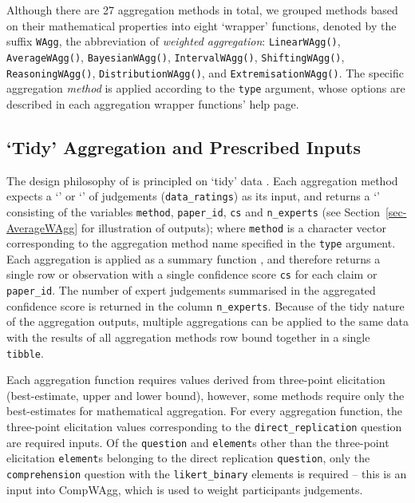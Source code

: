 \documentclass[article]{jss}
\newcommand{\class}[1]{`\code{#1}'}
\begin{document}
Although there are 27 aggregation methods in total, we grouped methods
based on their mathematical properties into eight `wrapper' functions,
denoted by the suffix \texttt{WAgg}, the abbreviation of \emph{weighted
aggregation}: \texttt{LinearWAgg()}, \texttt{AverageWAgg()},
\texttt{BayesianWAgg()}, \texttt{IntervalWAgg()},
\texttt{ShiftingWAgg()}, \texttt{ReasoningWAgg()},
\texttt{DistributionWAgg()}, and \texttt{ExtremisationWAgg()}. The
specific aggregation \emph{method} is applied according to the
\texttt{type} argument, whose options are described in each aggregation
wrapper functions' help page.

\hypertarget{tidy-aggregation-and-prescribed-inputs}{%
\subsection{`Tidy' Aggregation and Prescribed
Inputs}\label{tidy-aggregation-and-prescribed-inputs}}

The design philosophy of  is principled on `tidy' data
\citep{Wickham:2014vp}. Each aggregation method expects a
\class{data.frame} or \class{tibble} of judgements
(\texttt{data\_ratings}) as its input, and returns a \class{tibble}
consisting of the variables \texttt{method}, \texttt{paper\_id},
\texttt{cs} and \texttt{n\_experts} (see Section~\ref{sec-AverageWAgg}
for illustration of outputs); where \texttt{method} is a character
vector corresponding to the aggregation method name specified in the
\texttt{type} argument. Each aggregation is applied as a summary
function \citep{Wickham2017R}, and therefore returns a single row or
observation with a single confidence score \texttt{cs} for each claim or
\texttt{paper\_id}. The number of expert judgements summarised in the
aggregated confidence score is returned in the column
\texttt{n\_experts}. Because of the tidy nature of the aggregation
outputs, multiple aggregations can be applied to the same data with the
results of all aggregation methods row bound together in a single
\texttt{tibble}.

Each aggregation function requires values derived from three-point
elicitation (best-estimate, upper and lower bound), however, some
methods require only the best-estimates for mathematical aggregation.
For every aggregation function, the three-point elicitation values
corresponding to the \texttt{direct\_replication} question are required
inputs. Of the \texttt{question} and \texttt{element}s other than the
three-point elicitation \texttt{element}s belonging to the direct
replication \texttt{question}, only the \texttt{comprehension} question
with the \texttt{likert\_binary} elements is required -- this is an
input into {CompWAgg}, which is used to weight participants judgements.
\end{document}
